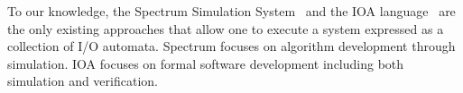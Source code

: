 


To our knowledge, the Spectrum Simulation System~\cite{goldman1990distributed} and the IOA language~\cite{garland2003ioa} are the only existing approaches that allow one to execute a system expressed as a collection of I/O automata.
Spectrum focuses on algorithm development through simulation.
IOA focuses on formal software development including both simulation and verification.

